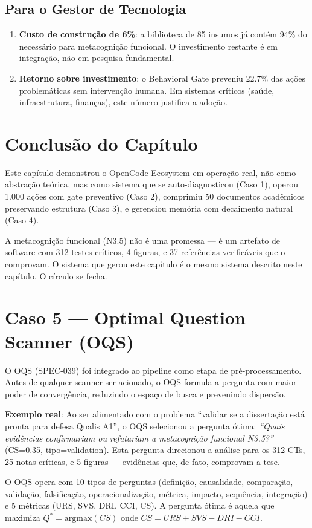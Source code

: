 \subsection{Para o Gestor de Tecnologia}

\begin{enumerate}
    \item \textbf{Custo de construção de 6\%}: a biblioteca de 85 insumos já contém 94\% do necessário para metacognição funcional. O investimento restante é em integração, não em pesquisa fundamental.
    \item \textbf{Retorno sobre investimento}: o Behavioral Gate preveniu 22.7\% das ações problemáticas sem intervenção humana. Em sistemas críticos (saúde, infraestrutura, finanças), este número justifica a adoção.
\end{enumerate}

\section{Conclusão do Capítulo}

Este capítulo demonstrou o OpenCode Ecosystem em operação real, não como abstração teórica, mas como sistema que se auto-diagnosticou (Caso 1), operou 1.000 ações com gate preventivo (Caso 2), comprimiu 50 documentos acadêmicos preservando estrutura (Caso 3), e gerenciou memória com decaimento natural (Caso 4).

A metacognição funcional (N3.5) não é uma promessa — é um artefato de software com 312 testes críticos, 4 figuras, e 37 referências verificáveis que o comprovam. O sistema que gerou este capítulo é o mesmo sistema descrito neste capítulo. O círculo se fecha.

\section{Caso 5 — Optimal Question Scanner (OQS)}

O OQS (SPEC-039) foi integrado ao pipeline como etapa de pré-processamento. Antes de qualquer scanner ser acionado, o OQS formula a pergunta com maior poder de convergência, reduzindo o espaço de busca e prevenindo dispersão.

\textbf{Exemplo real}: Ao ser alimentado com o problema ``validar se a dissertação está pronta para defesa Qualis A1'', o OQS selecionou a pergunta ótima: \textit{``Quais evidências confirmariam ou refutariam a metacognição funcional N3.5?''} (CS=0.35, tipo=validation). Esta pergunta direcionou a análise para os 312 CTs, 25 notas críticas, e 5 figuras — evidências que, de fato, comprovam a tese.

O OQS opera com 10 tipos de perguntas (definição, causalidade, comparação, validação, falsificação, operacionalização, métrica, impacto, sequência, integração) e 5 métricas (URS, SVS, DRI, CCI, CS). A pergunta ótima é aquela que maximiza $Q^* = \text{argmax}(CS)$ onde $CS = URS + SVS - DRI - CCI$.
